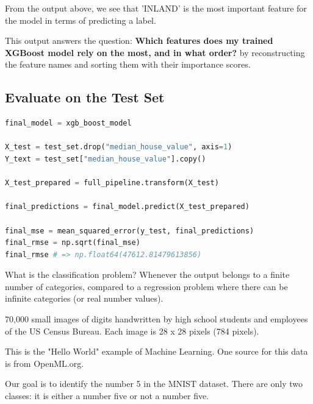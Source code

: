 {

From the output above, we see that 'INLAND' is the most important feature for the model in terms of predicting a label.

This output answers the question: \textbf{Which features does my trained XGBoost model rely on the most, and in what order?} by reconstructing the feature names and sorting them with their importance scores.

\vspace{11pt}
\subsection{Evaluate on the Test Set}
\vspace{11pt}

\begin{lstlisting}[language=python, breaklines=true]
final_model = xgb_boost_model

X_test = test_set.drop("median_house_value", axis=1)
Y_text = test_set["median_house_value"].copy()

X_test_prepared = full_pipeline.transform(X_test)

final_predictions = final_model.predict(X_test_prepared)

final_mse = mean_squared_error(y_test, final_predictions)
final_rmse = np.sqrt(final_mse)
final_rmse # => np.float64(47612.81479613856)
\end{lstlisting}

\newpage


What is the classification problem? Whenever the output belongs to a finite number of categories, compared to a regression problem where there can be infinite categories (or real number values).


70,000 small images of digits handwritten by high school students and employees of the US Census Bureau. Each image is 28 x 28 pixels (784 pixels).

This is the "Hello World" example of Machine Learning. One source for this data is from OpenML.org.




Our goal is to identify the number 5 in the MNIST dataset. There are only two classes: it is either a number five or not a number five. 

}

